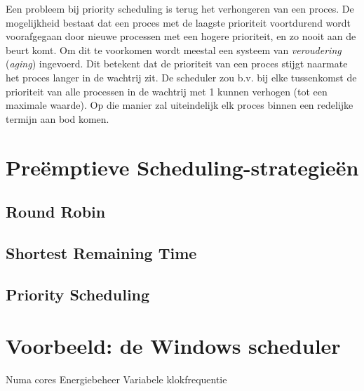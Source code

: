 Een probleem bij priority scheduling is terug het verhongeren
van een proces. De mogelijkheid bestaat dat een proces met de
laagste prioriteit voortdurend wordt voorafgegaan door nieuwe
processen met een hogere prioriteit, en zo nooit aan de beurt komt. Om dit te
voorkomen wordt meestal een systeem van \emph{veroudering} (\emph{aging})
ingevoerd. Dit betekent dat de prioriteit van een proces stijgt naarmate het
proces langer in de wachtrij zit. De scheduler zou b.v. bij elke tussenkomst de
prioriteit van alle processen in de wachtrij met 1 kunnen verhogen (tot een
maximale waarde). Op die manier zal uiteindelijk elk proces binnen een redelijke
termijn aan bod komen.

\section{Pre\"emptieve Scheduling-strategie\"en}


\subsection{Round Robin}


\subsection{Shortest Remaining Time}


\subsection{Priority Scheduling}


\section{Voorbeeld: de Windows scheduler}


Numa cores
Energiebeheer
Variabele klokfrequentie
